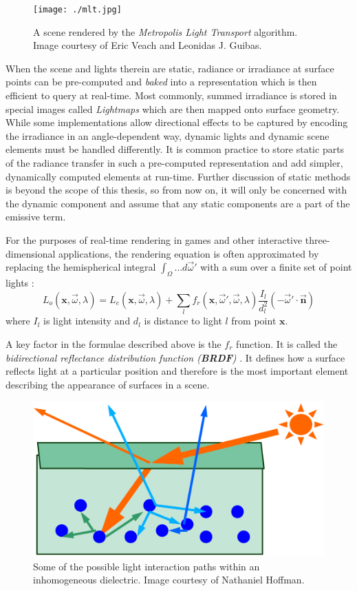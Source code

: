 \begin{figure}[h!]
  \centering
    \texttt{[image: ./mlt.jpg]}
    \caption[Metropolis Light Transport]{A scene rendered by the \emph{Metropolis Light Transport} algorithm. Image courtesy of Eric Veach and Leonidas J. Guibas.}
  \label{fig:MLT}
\end{figure}

When the scene and lights therein are static, radiance or irradiance at surface points can be pre-computed and \emph{baked} into a representation which is then efficient to query at real-time. Most commonly, summed irradiance is stored in special images called \emph{Lightmaps} \cite{lightmaps} which are then mapped onto surface geometry. While some implementations \cite{Chen08Halo3} allow directional effects to be captured by encoding the irradiance in an angle-dependent way, dynamic lights and dynamic scene elements must be handled differently. It is common practice to store static parts of the radiance transfer in such a pre-computed representation and add simpler, dynamically computed elements at run-time. Further discussion of static methods is beyond the scope of this thesis, so from now on, it will only be concerned with the dynamic component and assume that any static components are a part of the emissive term.

For the purposes of real-time rendering in games and other interactive three-dimensional applications, the rendering equation is often approximated by replacing the hemispherical integral $\int_\Omega \ldots d \overrightarrow{\omega}'$ with a sum over a finite set of point lights \cite{Naty06Reflectance}:
\[
L_o(\mathbf x, \overrightarrow{\omega}, \lambda) = L_e(\mathbf x, \overrightarrow{\omega}, \lambda) + \sum_l f_r(\mathbf x, \overrightarrow{\omega}', \overrightarrow{\omega}, \lambda) \frac{I_l}{d_l^2} (-\overrightarrow{\omega}' \cdot \overrightarrow{\mathbf n})
\]
where $I_l$ is light intensity and $d_l$ is distance to light $l$ from point $\mathbf x$.

A key factor in the formulae described above is the $f_r$ function. It is called the \emph{bidirectional reflectance distribution function (\textbf{BRDF})} \cite{Nicodemus:65}. It defines how a surface reflects light at a particular position and therefore is the most important element describing the appearance of surfaces in a scene.

\begin{figure}[h!]
  \centering
    \includegraphics[width=0.4\linewidth]{./Chapters/InhomogeneousDielectric.png}
    \caption[Inhomogeneous dielectric]{Some of the possible light interaction paths within an inhomogeneous dielectric. Image courtesy of Nathaniel Hoffman.}
  \label{fig:InhomogeneousDielectric}
\end{figure}

